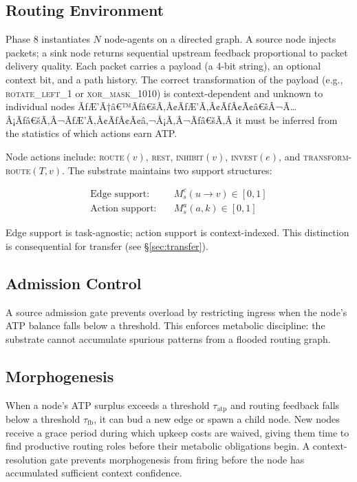 \documentclass[10pt,twocolumn]{article}
\newcommand{\Ms}{M_s}
\begin{document}
\subsection{Routing Environment}

Phase 8 instantiates $N$ node-agents on a directed graph.
A source node injects packets; a sink node returns sequential upstream
feedback proportional to packet delivery quality.
Each packet carries a payload (a 4-bit string), an optional context bit,
and a path history.
The correct transformation of the payload (e.g., \textsc{rotate\_left\_1} or
\textsc{xor\_mask\_1010}) is context-dependent and unknown to individual nodes
ÃƒÆ’Ã†â€™Ãƒâ€šÃ‚Â¢ÃƒÆ’Ã‚Â¢ÃƒÂ¢Ã¢â€šÂ¬Ã…Â¡Ãƒâ€šÃ‚Â¬ÃƒÆ’Ã‚Â¢ÃƒÂ¢Ã¢â‚¬Å¡Ã‚Â¬Ãƒâ€šÃ‚Â it must be inferred from the statistics of which actions earn ATP.

Node actions include: \textsc{route}$(v)$, \textsc{rest},
\textsc{inhibit}$(v)$, \textsc{invest}$(e)$, and
\textsc{transform-route}$(T, v)$.
The substrate maintains two support structures:

\begin{align}
  \text{Edge support:}\quad & \Ms^e(u \to v) \in [0,1] \\
  \text{Action support:}\quad & \Ms^a(a, k) \in [0,1]
\end{align}

Edge support is task-agnostic; action support is context-indexed.
This distinction is consequential for transfer (see \S\ref{sec:transfer}).

\subsection{Admission Control}

A source admission gate prevents overload by restricting ingress when the
node's ATP balance falls below a threshold.
This enforces metabolic discipline: the substrate cannot accumulate spurious
patterns from a flooded routing graph.

\subsection{Morphogenesis}

When a node's ATP surplus exceeds a threshold $\tau_{\mathrm{atp}}$ and
routing feedback falls below a threshold $\tau_{\mathrm{fb}}$, it can bud a
new edge or spawn a child node.
New nodes receive a grace period during which upkeep costs are waived, giving
them time to find productive routing roles before their metabolic obligations
begin.
A context-resolution gate prevents morphogenesis from firing before the
node has accumulated sufficient context confidence.
\end{document}
